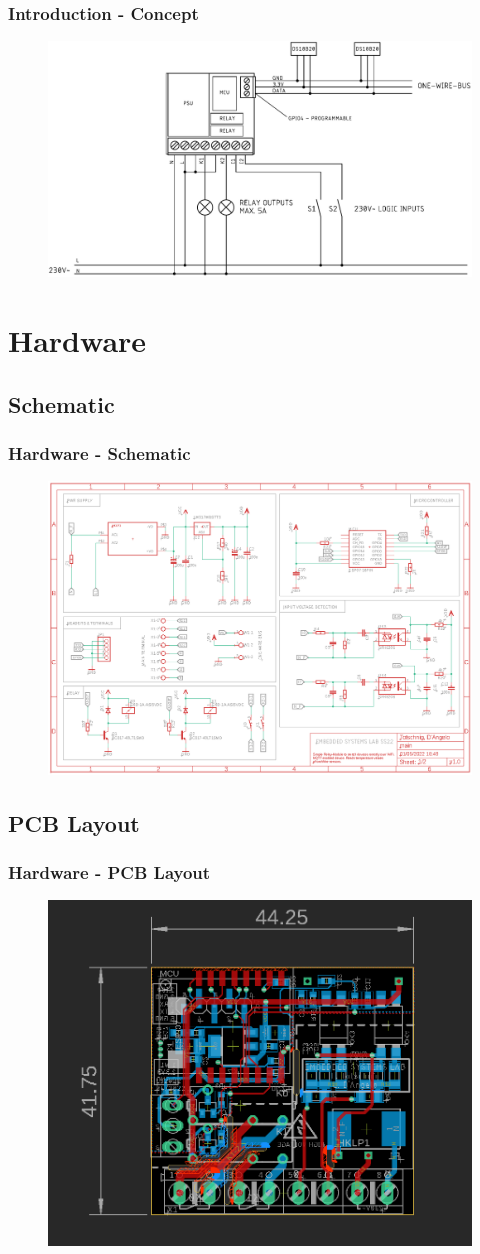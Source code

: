 \documentclass[aspectratio=169]{beamer}
\begin{document}
\begin{frame}
\frametitle{Introduction - Concept}
\begin{figure}
\includegraphics[width=0.6\linewidth]{./figures/concept.pdf}
\end{figure}
\end{frame}

\section{Hardware}
\subsection{Schematic}
\begin{frame}
\frametitle{Hardware - Schematic}
\begin{figure}
\includegraphics[width=0.65\linewidth]{./figures/schematic.png}
\end{figure}
\end{frame}

\subsection{PCB Layout}
\begin{frame}
\frametitle{Hardware - PCB Layout}
\begin{figure}
\includegraphics[width=0.5\linewidth]{./figures/layout.png}
\end{figure}
\end{frame}
\end{document}
